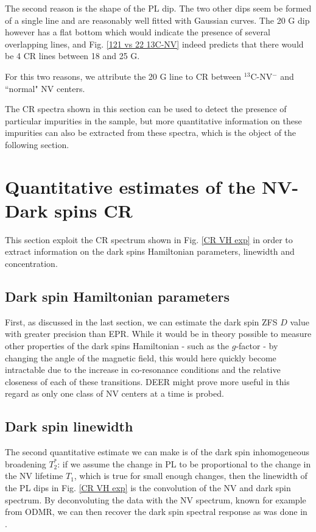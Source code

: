 \documentclass[a4paper, 11pt]{book}
\begin{document}
The second reason is the shape of the PL dip. The two other dips seem be formed of a single line and are reasonably well fitted with Gaussian curves. The 20 G dip however has a flat bottom which would indicate the presence of several overlapping lines, and Fig. \ref{121 vs 22 13C-NV} indeed predicts that there would be 4 CR lines between 18 and 25 G.

For this two reasons, we attribute the 20 G line to CR between $^{13}$C-NV$^-$ and ``normal" NV centers.

\bigskip

The CR spectra shown in this section can be used to detect the presence of particular impurities in the sample, but more quantitative information on these impurities can also be extracted from these spectra, which is the object of the following section.

\section{Quantitative estimates of the NV-Dark spins CR}

This section exploit the CR spectrum shown in Fig. \ref{CR VH exp} in order to extract information on the dark spins Hamiltonian parameters, linewidth and concentration.

\subsection{Dark spin Hamiltonian parameters}

First, as discussed in the last section, we can estimate the dark spin ZFS $D$ value with greater precision than EPR. While it would be in theory possible to measure other properties of the dark spins Hamiltonian - such as the $g$-factor - by changing the angle of the magnetic field, this would here quickly become intractable due to the increase in co-resonance conditions and the relative closeness of each of these transitions. DEER might prove more useful in this regard as only one class of NV centers at a time is probed.

\subsection{Dark spin linewidth}

The second quantitative estimate we can make is of the dark spin inhomogeneous broadening $T_2^*$: if we assume the change in PL to be proportional to the change in the NV lifetime $T_1$, which is true for small enough changes, then the linewidth of the PL dips in Fig. \ref{CR VH exp} is the convolution of the NV and dark spin spectrum. By deconvoluting the data with the NV spectrum, known for example from ODMR, we can then recover the dark spin spectral response as was done in \citep{hall2016detection}. 
\end{document}
